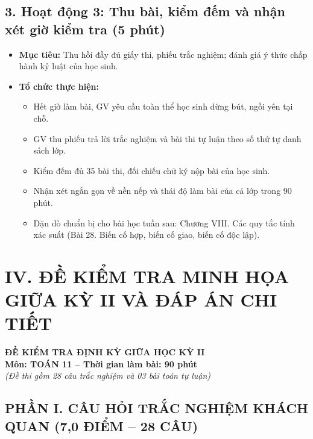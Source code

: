 \documentclass[12pt, a4paper]{article}
\begin{document}
\subsection*{3. Hoạt động 3: Thu bài, kiểm đếm và nhận xét giờ kiểm tra (5 phút)}

\begin{itemize}[leftmargin=1.2cm]
    \item[a)] \textbf{Mục tiêu:} Thu hồi đầy đủ giấy thi, phiếu trắc nghiệm; đánh giá ý thức chấp hành kỷ luật của học sinh.
    \item[b)] \textbf{Tổ chức thực hiện:}
    \begin{itemize}[leftmargin=0.6cm]
        \item Hết giờ làm bài, GV yêu cầu toàn thể học sinh dừng bút, ngồi yên tại chỗ.
        \item GV thu phiếu trả lời trắc nghiệm và bài thi tự luận theo số thứ tự danh sách lớp.
        \item Kiểm đếm đủ 35 bài thi, đối chiếu chữ ký nộp bài của học sinh.
        \item Nhận xét ngắn gọn về nền nếp và thái độ làm bài của cả lớp trong 90 phút.
        \item Dặn dò chuẩn bị cho bài học tuần sau: Chương VIII. Các quy tắc tính xác suất (Bài 28. Biến cố hợp, biến cố giao, biến cố độc lập).
    \end{itemize}
\end{itemize}

\section*{IV. ĐỀ KIỂM TRA MINH HỌA GIỮA KỲ II VÀ ĐÁP ÁN CHI TIẾT}

\begin{center}
    \textbf{\large ĐỀ KIỂM TRA ĐỊNH KỲ GIỮA HỌC KỲ II}\\[2pt]
    \textbf{Môn: TOÁN 11 -- Thời gian làm bài: 90 phút}\\[4pt]
    \textit{(Đề thi gồm 28 câu trắc nghiệm và 03 bài toán tự luận)}
\end{center}

\subsection*{PHẦN I. CÂU HỎI TRẮC NGHIỆM KHÁCH QUAN (7,0 ĐIỂM -- 28 CÂU)}
\end{document}
